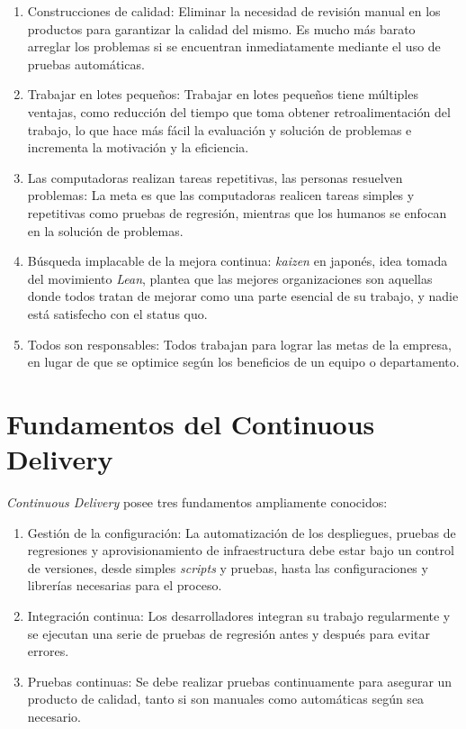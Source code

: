 \begin{enumerate}
    \item Construcciones de calidad: Eliminar la necesidad de revisión manual en los productos para garantizar la calidad del mismo. Es mucho más barato arreglar los problemas si se encuentran inmediatamente mediante el uso de pruebas automáticas.

    \item Trabajar en lotes pequeños: Trabajar en lotes pequeños tiene múltiples ventajas, como reducción del tiempo que toma obtener retroalimentación del trabajo, lo que hace más fácil la evaluación y solución de problemas e incrementa la motivación y la eficiencia.

    \item Las computadoras realizan tareas repetitivas, las personas resuelven problemas: La meta es que las computadoras realicen tareas simples y repetitivas como pruebas de regresión, mientras que los humanos se enfocan en la solución de problemas.

    \item Búsqueda implacable de la mejora continua: \textit{kaizen} en japonés, idea tomada del movimiento \textit{Lean}, plantea que las mejores organizaciones son aquellas donde todos tratan de mejorar como una parte esencial de su trabajo, y nadie está satisfecho con el status quo.

    \item Todos son responsables: Todos trabajan para lograr las metas de la empresa, en lugar de que se optimice según los beneficios de un equipo o departamento.

\end{enumerate}

\section{Fundamentos del Continuous Delivery}

\textit{Continuous Delivery} posee tres fundamentos ampliamente conocidos:

\begin{enumerate}

    \item Gestión de la configuración: La automatización de los despliegues, pruebas de regresiones y aprovisionamiento de infraestructura debe estar bajo un control de versiones, desde simples \textit{scripts} y pruebas, hasta las configuraciones y librerías necesarias para el proceso.

    \item Integración continua: Los desarrolladores integran su trabajo regularmente y se ejecutan una serie de pruebas de regresión antes y después para evitar errores.

    \item Pruebas continuas: Se debe realizar pruebas continuamente para asegurar un producto de calidad, tanto si son manuales como automáticas según sea necesario.

\end{enumerate}

